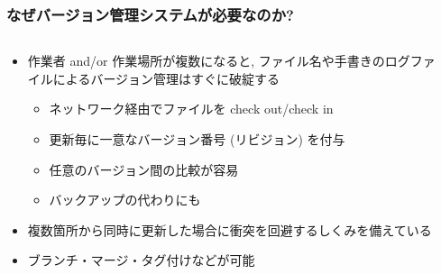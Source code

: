 \begin{frame}
  \frametitle{なぜバージョン管理システムが必要なのか?}
  \begin{columns}[T]
    \begin{column}{.7\textwidth}
      \begin{itemize}
        \setlength{\itemsep}{1em}
      \item 作業者 and/or 作業場所が複数になると, ファイル名や手書きのログファイルによるバージョン管理はすぐに破綻する
        \begin{itemize}
        \item ネットワーク経由でファイルを check out/check in
        \item 更新毎に一意なバージョン番号 (リビジョン) を付与
        \item 任意のバージョン間の比較が容易
        \item バックアップの代わりにも
        \end{itemize}
      \item 複数箇所から同時に更新した場合に衝突を回避するしくみを備えている
      \item ブランチ・マージ・タグ付けなどが可能
      \end{itemize}
    \end{column}
    \begin{column}{.25\textwidth}

\end{column}
\end{columns}
\end{frame}
